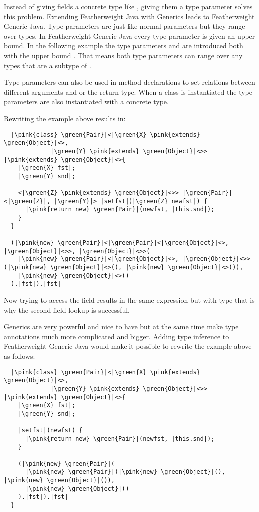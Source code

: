 Instead of giving fields a concrete type like , giving them a type parameter solves this problem.
Extending Featherweight Java with Generics leads to Featherweight Generic Java.
Type parameters are just like normal parameters but they range over types. In Featherweight Generic Java every type parameter is given an upper bound.
In the following example the type parameters  and  are introduced both with the upper bound .
That means both type parameters can range over any types that are a subtype of .

Type parameters can also be used in method declarations to set relations between different arguments and or the return type.
When a class is instantiated the type parameters are also instantiated with a concrete type.

Rewriting the example above results in:

\begin{verbatim}
  |\pink{class} \green{Pair}|<|\green{X} \pink{extends} \green{Object}|<>,
             |\green{Y} \pink{extends} \green{Object}|<>> |\pink{extends} \green{Object}|<>{
    |\green{X} fst|;
    |\green{Y} snd|;

    <|\green{Z} \pink{extends} \green{Object}|<>> |\green{Pair}|<|\green{Z}|, |\green{Y}|> |setfst|(|\green{Z} newfst|) {
      |\pink{return new} \green{Pair}|(newfst, |this.snd|);
    }
  }

  (|\pink{new} \green{Pair}|<|\green{Pair}|<|\green{Object}|<>, |\green{Object}|<>>, |\green{Object}|<>>(
    |\pink{new} \green{Pair}|<|\green{Object}|<>, |\green{Object}|<>>(|\pink{new} \green{Object}|<>(), |\pink{new} \green{Object}|<>()),
    |\pink{new} \green{Object}|<>()
  ).|fst|).|fst|
\end{verbatim}

Now trying to access the field  results in the same expression but with type  that is why the second field lookup is successful.

Generics are very powerful and nice to have but at the same time make type annotations much more complicated and bigger.
Adding type inference to Featherweight Generic Java would make it possible to rewrite the example above as follows:

\begin{verbatim}
  |\pink{class} \green{Pair}|<|\green{X} \pink{extends} \green{Object}|<>,
             |\green{Y} \pink{extends} \green{Object}|<>> |\pink{extends} \green{Object}|<>{
    |\green{X} fst|;
    |\green{Y} snd|;

    |setfst|(newfst) {
      |\pink{return new} \green{Pair}|(newfst, |this.snd|);
    }

    (|\pink{new} \green{Pair}|(
      |\pink{new} \green{Pair}|(|\pink{new} \green{Object}|(), |\pink{new} \green{Object}|()),
      |\pink{new} \green{Object}|()
    ).|fst|).|fst|
  }
\end{verbatim}

